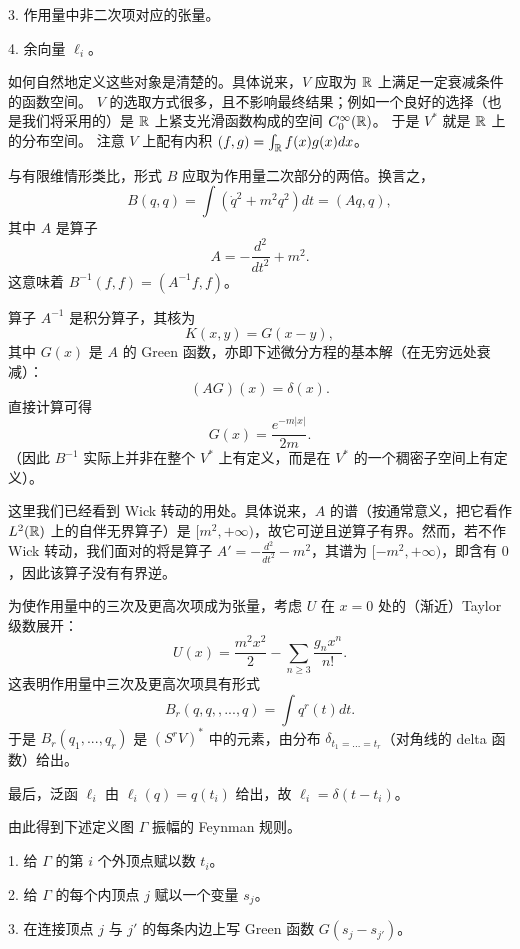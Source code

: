 3. 作用量中非二次项对应的张量。

4. 余向量 $\ell_i$。

如何自然地定义这些对象是清楚的。具体说来，$V$ 应取为 $\Bbb R$ 上满足一定衰减条件的函数空间。
$V$ 的选取方式很多，且不影响最终结果；例如一个良好的选择（也是我们将采用的）是 $\Bbb R$ 上紧支光滑函数构成的空间 $C^\infty_0(\Bbb R)$。
于是 $V^*$ 就是 $\Bbb R$ 上的分布空间。
注意 $V$ 上配有内积 $(f,g)=\int_{\Bbb R}f(x)g(x)dx$。

与有限维情形类比，形式 $B$ 应取为作用量二次部分的两倍。换言之，
$$
B(q,q)=\int(\dot{q}^2+m^2q^2)dt=(Aq,q),
$$ 
其中 $A$ 是算子
$$
A=-\frac{d^2}{dt^2}+m^2.
$$ 
这意味着 $B^{-1}(f,f)=(A^{-1}f,f)$。

算子 $A^{-1}$ 是积分算子，其核为
$$
K(x,y)=G(x-y),
$$ 
其中
$G(x)$ 是 $A$ 的 Green 函数，亦即下述微分方程的基本解（在无穷远处衰减）：
$$
(AG)(x)=\delta(x).
$$ 
直接计算可得
$$
G(x)=\frac{e^{-m|x|}}{2m}.
$$ 
（因此 $B^{-1}$ 实际上并非在整个 $V^*$ 上有定义，而是在 $V^*$ 的一个稠密子空间上有定义）。

\begin{remark} 这里我们已经看到 Wick 转动的用处。具体说来，$A$ 的谱（按通常意义，把它看作 $L^2(\Bbb R)$ 上的自伴无界算子）是 $[m^2,+\infty)$，故它可逆且逆算子有界。然而，若不作 Wick 转动，我们面对的将是算子 $A'=-\frac{d^2}{dt^2}-m^2$，其谱为 $[-m^2,+\infty)$，即含有 $0$，因此该算子没有有界逆。
\end{remark}

为使作用量中的三次及更高次项成为张量，考虑 $U$ 在 $x=0$ 处的（渐近）Taylor 级数展开：
$$
U(x)=\frac{m^2x^2}{2}-\sum_{n\ge 3}\frac{g_nx^n}{n!}.
$$ 
这表明作用量中三次及更高次项具有形式
$$
B_r(q,q,,...,q)=\int q^r(t)dt.
$$ 
于是 $B_r(q_1,...,q_r)$ 是 $(S^rV)^*$ 中的元素，由分布 $\delta_{t_1=...=t_r}$（对角线的 delta 函数）给出。

最后，泛函 $\ell_i$ 由 $\ell_i(q)=q(t_i)$ 给出，故 $\ell_i=\delta(t-t_i)$。

由此得到下述定义图 $\Gamma$ 振幅的 Feynman 规则。

1. 给 $\Gamma$ 的第 $i$ 个外顶点赋以数 $t_i$。

2. 给 $\Gamma$ 的每个内顶点 $j$ 赋以一个变量 $s_j$。

3. 在连接顶点 $j$ 与 $j'$ 的每条内边上写 Green 函数 $G(s_j-s_{j'})$。

